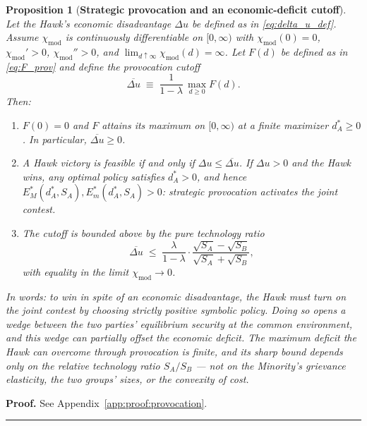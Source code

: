 \documentclass[11pt,twoside]{extarticle}
\newtheorem{proposition}{Proposition}
\newenvironment{proof}[1][Proof]{\noindent \textbf{#1.} }{\ \rule{0.5em}{0.5em}}
\begin{document}
\begin{proposition}[\textbf{Strategic provocation and an economic-deficit cutoff}] \label{prop:provocation}
Let the Hawk's economic disadvantage $\Delta u$ be defined as in \autoref{eq:delta_u_def}. Assume $\chi_{\mathrm{mod}}$ is continuously differentiable on $[0,\infty)$ with $\chi_{\mathrm{mod}}(0)=0$, $\chi_{\mathrm{mod}}'>0$, $\chi_{\mathrm{mod}}''>0$, and $\lim_{d\uparrow\infty}\chi_{\mathrm{mod}}(d)=\infty$. Let $F(d)$ be defined as in \autoref{eq:F_prov} and define the \emph{provocation cutoff}
\begin{equation} \label{eq:delta_u_bar}
\overline{\Delta u}\;\equiv\;\frac{1}{1-\lambda}\,\max_{d\ge 0}F(d).
\end{equation}
Then:
\begin{enumerate}[label=(\roman*)]
    \item $F(0)=0$ and $F$ attains its maximum on $[0,\infty)$ at a finite maximizer $d_A^*\ge 0$. In particular, $\overline{\Delta u}\ge 0$.
    \item A Hawk victory is feasible if and only if $\Delta u\le \overline{\Delta u}$. If $\Delta u>0$ and the Hawk wins, any optimal policy satisfies $d_A^*>0$, and hence $E_M^*(d_A^*,S_A),E_m^*(d_A^*,S_A)>0$: strategic provocation activates the joint contest.
    \item The cutoff is bounded above by the pure technology ratio
    \begin{equation} \label{eq:delta_u_bar_bound}
    \overline{\Delta u}\;\le\;\frac{\lambda}{1-\lambda}\cdot\frac{\sqrt{S_A}-\sqrt{S_B}}{\sqrt{S_A}+\sqrt{S_B}},
    \end{equation}
    with equality in the limit $\chi_{\mathrm{mod}}\to 0$.
\end{enumerate}
In words: to win in spite of an economic disadvantage, the Hawk must turn on the joint contest by choosing strictly positive symbolic policy. Doing so opens a wedge between the two parties' equilibrium security at the common environment, and this wedge can partially offset the economic deficit. The maximum deficit the Hawk can overcome through provocation is finite, and its sharp bound depends only on the relative technology ratio $S_A/S_B$ — not on the Minority's grievance elasticity, the two groups' sizes, or the convexity of cost.
\end{proposition}

\begin{proof}
See Appendix~\autoref{app:proof:provocation}.
\end{proof}
\end{document}
